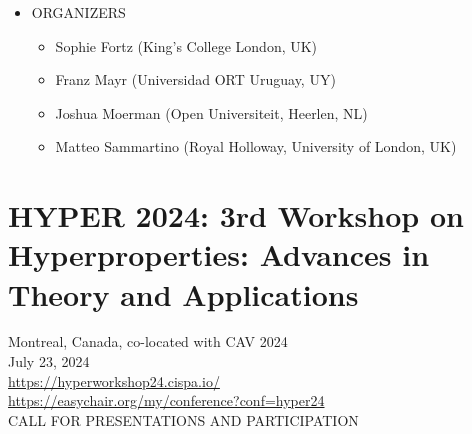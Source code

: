 \documentclass[prodmode,acmtecs]{acmsmall} %
\begin{document}
\begin{itemize}
\item  ORGANIZERS 
 
\begin{itemize}\item  Sophie Fortz (King's College London, UK)
\item  Franz Mayr (Universidad ORT Uruguay, UY)
\item  Joshua Moerman (Open Universiteit, Heerlen, NL)
\item  Matteo Sammartino (Royal Holloway, University of London, UK)
\end{itemize} 
\end{itemize}\section{HYPER 2024: 3rd Workshop on Hyperproperties: Advances in Theory and Applications}\label{HYPER2024}  Montreal, Canada, co-located with CAV 2024\\ 
  July 23, 2024 \\ 
  \href{https://hyperworkshop24.cispa.io/}{https://hyperworkshop24.cispa.io/}\\ 
  \href{https://easychair.org/my/conference?conf=hyper24}{https://easychair.org/my/conference?conf=hyper24}\\ 
CALL FOR PRESENTATIONS AND PARTICIPATION 
\end{document}
